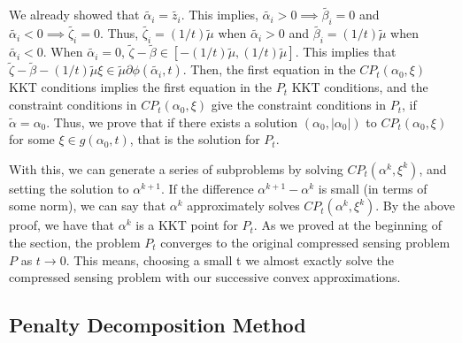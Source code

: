 \documentclass[letterpaper, 10 pt, conference]{article}
\begin{document}
\noindent We already showed that $\tilde{\alpha_i} = \tilde{z_i}$. This implies, $\tilde{\alpha_i} > 0 \implies \tilde{\beta_i} = 0$ and $\tilde{\alpha_i} < 0 \implies \tilde{\zeta_i} = 0$. Thus, $\tilde{\zeta_i} = (1/t)\tilde{\mu}$ when $\tilde{\alpha_i} > 0$ and $\tilde{\beta_i} = (1/t)\tilde{\mu}$ when $\tilde{\alpha_i} < 0$. When $\tilde{\alpha_i} = 0$, $\tilde{\zeta} - \tilde{\beta} \in \left[-(1/t)\tilde{\mu}, (1/t)\tilde{\mu}\right]$. This implies that $\tilde{\zeta} - \tilde{\beta} - (1/t) \tilde{\mu} \xi \in \tilde{\mu} \partial\phi(\tilde{\alpha_i}, t)$. Then, the first equation in the $CP_t(\alpha_0, \xi)$ KKT conditions implies the first equation in the $P_t$ KKT conditions, and the constraint conditions in $CP_t(\alpha_0, \xi)$ give the constraint conditions in $P_t$, if $\tilde{\alpha} = \alpha_0$. Thus, we prove that if there exists a solution $(\alpha_0, |\alpha_0|)$ to $CP_t(\alpha_0, \xi)$ for some $\xi \in g(\alpha_0, t)$, that is the solution for $P_t$.

With this, we can generate a series of subproblems by solving $CP_t(\alpha^k, \xi^k)$, and setting the solution to $\alpha^{k+1}$. If the difference $\alpha^{k+1} - \alpha^{k}$ is small (in terms of some norm), we can say that $\alpha^{k}$ approximately solves $CP_t(\alpha^k, \xi^k)$. By the above proof, we have that $\alpha^k$ is a KKT point for $P_t$. As we proved at the beginning of the section, the problem $P_t$ converges to the original compressed sensing problem $P$ as $t \rightarrow 0$. This means, choosing a small t we almost exactly solve the compressed sensing problem with our successive convex approximations.

\subsection{Penalty Decomposition Method}
\end{document}
